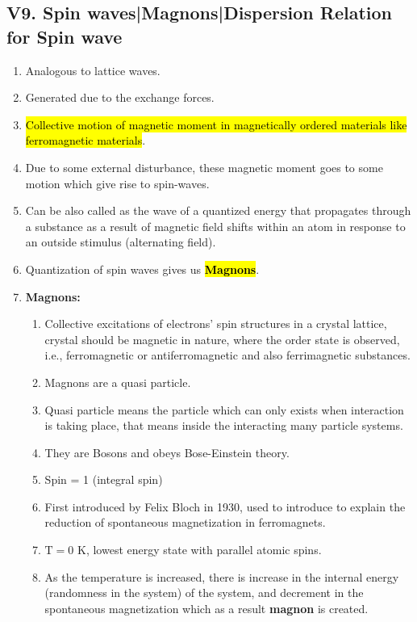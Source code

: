 \subsection*{V9. Spin waves|Magnons|Dispersion Relation for Spin wave}
\begin{enumerate}
    \item Analogous to lattice waves.
    \item Generated due to the exchange forces.
    \item \hl{Collective motion of magnetic moment in magnetically ordered materials like ferromagnetic materials}.
    \item Due to some external disturbance, these magnetic moment goes to some motion which give rise to spin-waves.
    \item Can be also called as the wave of a quantized energy that propagates through a substance as a result of magnetic field shifts within an atom in response to an outside stimulus (alternating field).
    \item Quantization of spin waves gives us \hl{\textbf{Magnons}}.
    \item \textbf{Magnons:} 
    \begin{enumerate}[(i.)]
        \item Collective excitations of electrons' spin structures in a crystal lattice, crystal should be magnetic in nature, where the order state is observed, i.e., ferromagnetic or antiferromagnetic and also ferrimagnetic substances.
        \item Magnons are a quasi particle.
        \item Quasi particle means the particle which can only exists when interaction is taking place, that means inside the interacting many particle systems.
        \item They are Bosons and obeys Bose-Einstein theory.
        \item Spin = 1 (integral spin)
        \item First introduced by Felix Bloch in 1930, used to introduce to explain the reduction of spontaneous magnetization in ferromagnets.
        \item $\mathrm{T=0}$ K, lowest energy state with parallel atomic spins.
        \item As the temperature is increased, there is increase in the internal energy (randomness in the system) of the system, and decrement in the spontaneous magnetization which as a result \textbf{magnon} is created.

\end{enumerate}
\end{enumerate}
